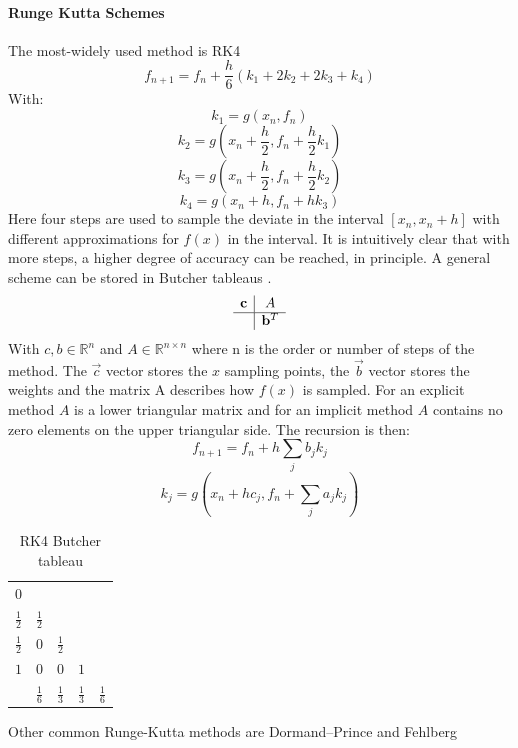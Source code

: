 \documentclass[Master]{subfiles}
\begin{document}
\paragraph{Runge Kutta Schemes}
The most-widely used method is RK4 \cite{runge1895numerische}
$$f_{n+1} = f_n + \frac{h}{6} (k_1 + 2k_2 + 2k_3 + k_4)$$
With:
$$k_1=g(x_n,f_n)$$
$$k_2=g(x_n + \frac{h}{2},f_n+\frac{h}{2}k_1 )$$
$$k_3=g(x_n+\frac{h}{2},f_n +\frac{h}{2}k_2)$$
$$k_4=g(x_n+h,f_n+ h k_3)$$
Here four steps are used to sample the deviate in the interval $[x_n,x_n+h]$ with different approximations for $f(x)$ in the interval. It is intuitively clear that with more steps, a higher degree of accuracy can be reached, in principle.
A general scheme can be stored in Butcher tableaus \cite{butcher1987numerical}.
$$
    \begin{array}{c|c}
        \vec{c} & A\\
         \hline
         & \vec{b}^T
    \end{array}
$$
With $c,b \in \mathbb{R}^n$ and $A \in \mathbb{R}^{n \times n}$ where n is the order or number of steps of the method.
The $\vec{c}$ vector stores the $x$ sampling points, the $\vec{b}$ vector stores the weights and the matrix A describes how $f(x)$ is sampled.
\mypagebreak
For an explicit method $A$ is a lower triangular matrix and for an implicit method $A$ contains no zero elements on the upper triangular side.
The recursion is then:
$$
f_{n+1} = f_n + h \sum_j b_j k_j
$$
$$
k_j = g(x_n+h c_j, f_n + \sum_j a_j k_j)
$$
\begin{table}[H]
    \centering
    \begin{tabular}{c|cccc}
        $0$& & & &  \\
         $\frac{1}{2}$&$\frac{1}{2}$ & & &  \\
         $\frac{1}{2}$&$0$& $\frac{1}{2}$& &  \\
        $1$&$0$&$0$&$1$&  \\
         \hline
         & $\frac{1}{6}$&$\frac{1}{3}$ &$\frac{1}{3}$ & $\frac{1}{6}$
    \end{tabular}
    \caption{RK4 Butcher tableau}
\end{table}
Other common Runge-Kutta methods are Dormand–Prince\cite{DORMAND198019} and Fehlberg \cite{fehlberg1968classical}
\end{document}
